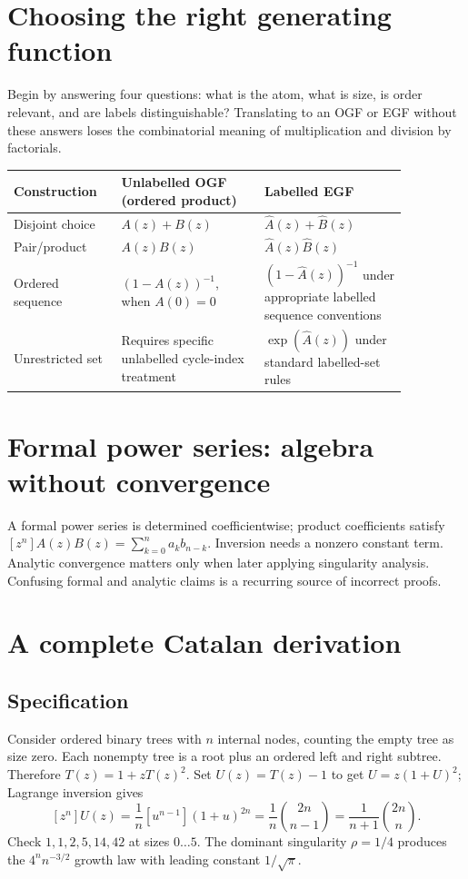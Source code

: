 \documentclass[11pt]{article}
\begin{document}
\makedoctocpage

\section{Choosing the right generating function}
Begin by answering four questions: what is the atom, what is size, is order relevant, and are labels distinguishable? Translating to an OGF or EGF without these answers loses the combinatorial meaning of multiplication and division by factorials.
\begin{longtable}{p{0.22\linewidth}p{0.32\linewidth}p{0.32\linewidth}}\toprule Construction & Unlabelled OGF (ordered product) & Labelled EGF \\ \midrule
Disjoint choice & $A(z)+B(z)$ & $\widehat A(z)+\widehat B(z)$ \\
Pair/product & $A(z)B(z)$ & $\widehat A(z)\widehat B(z)$ \\
Ordered sequence & $(1-A(z))^{-1}$, when $A(0)=0$ & $(1-\widehat A(z))^{-1}$ under appropriate labelled sequence conventions \\
Unrestricted set & Requires specific unlabelled cycle-index treatment & $\exp(\widehat A(z))$ under standard labelled-set rules \\
\bottomrule\end{longtable}
\section{Formal power series: algebra without convergence}
A formal power series is determined coefficientwise; product coefficients satisfy $[z^n]A(z)B(z)=\sum_{k=0}^n a_k b_{n-k}$. Inversion needs a nonzero constant term. Analytic convergence matters only when later applying singularity analysis. Confusing formal and analytic claims is a recurring source of incorrect proofs.
\section{A complete Catalan derivation}
\subsection{Specification}
Consider ordered binary trees with $n$ internal nodes, counting the empty tree as size zero. Each nonempty tree is a root plus an ordered left and right subtree. Therefore $T(z)=1+zT(z)^2$. Set $U(z)=T(z)-1$ to get $U=z(1+U)^2$; Lagrange inversion gives
\[
[z^n]U(z)=\frac{1}{n}[u^{n-1}](1+u)^{2n}=\frac1n\binom{2n}{n-1}=\frac{1}{n+1}\binom{2n}{n}.
\]
Check $1,1,2,5,14,42$ at sizes $0\ldots5$. The dominant singularity $\rho=1/4$ produces the $4^n n^{-3/2}$ growth law with leading constant $1/\sqrt\pi$.
\end{document}
